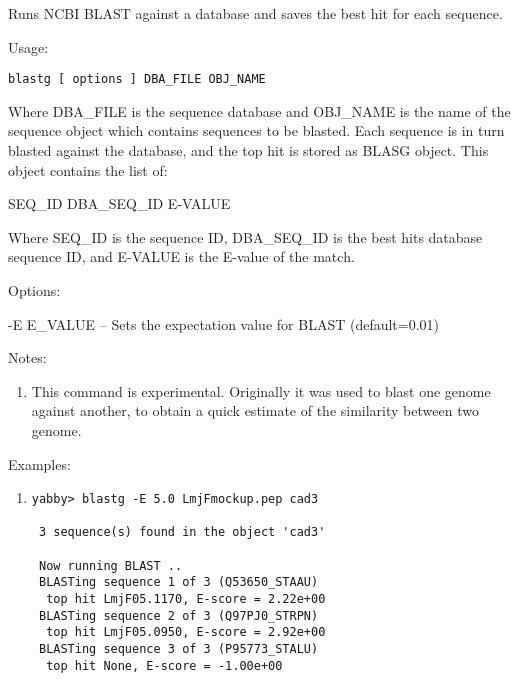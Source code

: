 Runs NCBI BLAST against a database and saves the best
hit for each sequence.


\begin{description}


\item{Usage:}

{\tt blastg [ options ] DBA\_FILE OBJ\_NAME}

 Where DBA\_FILE is the sequence database and OBJ\_NAME
 is the name of the sequence object which contains
 sequences to be blasted. Each sequence is in turn
 blasted against the database, and the top hit is
 stored as BLASG object. This object contains the
 list of:

 SEQ\_ID DBA\_SEQ\_ID E-VALUE

 Where SEQ\_ID is the sequence ID, DBA\_SEQ\_ID is the
 best hits database sequence ID, and E-VALUE is the
 E-value of the match.


\item{Options:}
\begin{description}
\item -E E\_VALUE -- Sets the expectation value for BLAST (default=0.01)
\end{description}


\item{Notes:}
\begin{enumerate}
\item This command is experimental. Originally it was used
 to blast one genome against another, to obtain a quick
 estimate of the similarity between two genome.
\end{enumerate}


\item{Examples:}
\begin{enumerate}

\item
\begin{verbatim}
yabby> blastg -E 5.0 LmjFmockup.pep cad3

 3 sequence(s) found in the object 'cad3'

 Now running BLAST ..
 BLASTing sequence 1 of 3 (Q53650_STAAU)
  top hit LmjF05.1170, E-score = 2.22e+00
 BLASTing sequence 2 of 3 (Q97PJ0_STRPN)
  top hit LmjF05.0950, E-score = 2.92e+00
 BLASTing sequence 3 of 3 (P95773_STALU)
  top hit None, E-score = -1.00e+00
\end{verbatim}


\end{enumerate}
\end{description}
